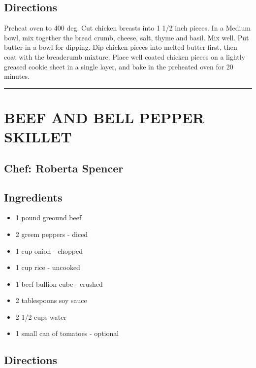 \documentclass[
]{book}
\providecommand{\tightlist}{%
  \setlength{\itemsep}{0pt}\setlength{\parskip}{0pt}}
\begin{document}
\hypertarget{directions-42}{%
\subsection*{Directions}\label{directions-42}}


Preheat oven to 400 deg. Cut chicken breasts into 1 1/2 inch pieces. In a Medium bowl, mix together the bread crumb, cheese, salt, thyme and basil. Mix well. Put butter in a bowl for dipping. Dip chicken pieces into melted butter first, then coat with the breadcrumb mixture. Place well coated chicken pieces on a lightly greased cookie sheet in a single layer, and bake in the preheated oven for 20 minutes.

\begin{center}\rule{0.5\linewidth}{0.5pt}\end{center}

\hypertarget{beef-and-bell-pepper-skillet}{%
\section*{BEEF AND BELL PEPPER SKILLET}\label{beef-and-bell-pepper-skillet}}


\hypertarget{chef-roberta-spencer-15}{%
\subsection*{Chef: Roberta Spencer}\label{chef-roberta-spencer-15}}


\hypertarget{ingredients-43}{%
\subsection*{Ingredients}\label{ingredients-43}}


\begin{itemize}
\tightlist
\item
  1 pound greound beef
\item
  2 greem peppers - diced
\item
  1 cup onion - chopped
\item
  1 cup rice - uncooked
\item
  1 beef bullion cube - crushed
\item
  2 tablespoons soy sauce
\item
  2 1/2 cups water
\item
  1 small can of tomatoes - optional
\end{itemize}

\hypertarget{directions-43}{%
\subsection*{Directions}\label{directions-43}}
\end{document}
